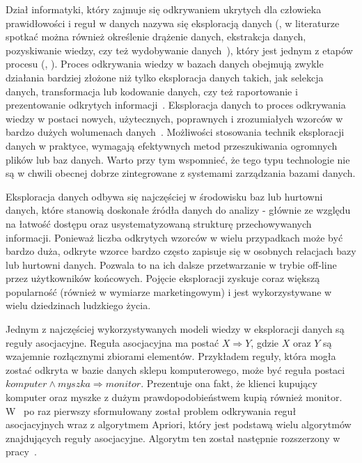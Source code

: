 Dział informatyki, który zajmuje się odkrywaniem ukrytych dla człowieka prawidłowości i reguł w danych nazywa się eksploracją danych (, w literaturze spotkać można również określenie drążenie danych, ekstrakcja danych, pozyskiwanie wiedzy, czy też wydobywanie danych~\cite{Elmasri:db}), który jest jednym z etapów procesu  (, ). Proces odkrywania wiedzy w bazach danych obejmują zwykle działania bardziej złożone niż tylko eksploracja danych takich, jak selekcja danych, transformacja lub kodowanie danych, czy też raportowanie i prezentowanie odkrytych informacji~\cite{Elmasri:db}. Eksploracja danych to proces odkrywania wiedzy w postaci nowych, użytecznych, poprawnych i zrozumiałych wzorców w bardzo dużych wolumenach danych~\cite{DataMiningStart}. Możliwości stosowania technik eksploracji danych w praktyce, wymagają efektywnych metod przeszukiwania ogromnych plików lub baz danych. Warto przy tym wspomnieć, że tego typu technologie nie są w chwili obecnej dobrze zintegrowane z systemami zarządzania bazami danych.

Eksploracja danych odbywa się najczęściej w środowisku baz lub hurtowni danych, które stanowią doskonałe źródła danych do analizy - głównie ze względu na łatwość dostępu oraz usystematyzowaną strukturę przechowywanych informacji. Ponieważ liczba odkrytych wzorców w wielu przypadkach może być bardzo duża, odkryte wzorce bardzo często zapisuje się w osobnych relacjach bazy lub hurtowni danych. Pozwala to na ich dalsze przetwarzanie w trybie off-line przez użytkowników końcowych. Pojęcie eksploracji zyskuje coraz większą popularność (również w wymiarze marketingowym) i jest wykorzystywane w wielu dziedzinach ludzkiego życia.

Jednym z najczęściej wykorzystywanych modeli wiedzy w eksploracji danych są reguły asocjacyjne. Reguła asocjacyjna ma postać $X \Rightarrow Y$, gdzie $X$ oraz $Y$ są wzajemnie rozłącznymi zbiorami elementów. Przykładem reguły, która mogła zostać odkryta w bazie danych sklepu komputerowego, może być reguła postaci $komputer \land myszka \Rightarrow monitor$. Prezentuje ona fakt, że klienci kupujący komputer oraz myszke z dużym prawdopodobieństwem kupią również monitor. W~\cite{Problem:Statement} po raz pierwszy sformułowany został problem odkrywania reguł asocjacyjnych wraz z algorytmem Apriori, który jest podstawą wielu algorytmów znajdujących reguły asocjacyjne. Algorytm ten został następnie rozszerzony w pracy~\cite{AssRulesStrt}.

